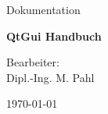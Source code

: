 \documentclass[BCOR5mm,DIV14,headexclude,a4paper,12pt,pdftex]{scrbook}
\begin{document}
\sloppy


\begin{titlepage}
  \thispagestyle{empty}
  \setcounter{page}{0}
  \begin{center}
    {\large Dokumentation}

  \vfill

    {\Large \textbf{QtGui Handbuch}}

  \vfill

  \vfill

    {\large Bearbeiter: \\
      Dipl.-Ing. M. Pahl}

  \vfill

\today
  \vfill
\end{center}

\vfill




\end{titlepage}

\begin{titlepage} \ 
  \thispagestyle{empty}
  \setcounter{page}{0}
\end{titlepage} 

\pagestyle{tntdasa}

\tableofcontents

\end{document}
